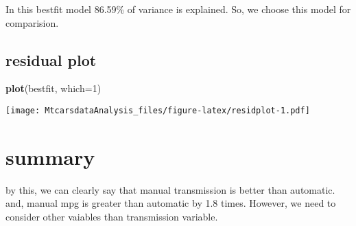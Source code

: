 \documentclass[
]{article}
\newenvironment{Shaded}{\begin{snugshade}}{\end{snugshade}}
\newcommand{\DataTypeTok}[1]{\textcolor[rgb]{0.13,0.29,0.53}{#1}}
\newcommand{\DecValTok}[1]{\textcolor[rgb]{0.00,0.00,0.81}{#1}}
\newcommand{\KeywordTok}[1]{\textcolor[rgb]{0.13,0.29,0.53}{\textbf{#1}}}
\newcommand{\NormalTok}[1]{#1}
\begin{document}
In this bestfit model 86.59\% of variance is explained. So, we choose
this model for comparision.

\hypertarget{residual-plot}{%
\subsection{residual plot}\label{residual-plot}}

\begin{Shaded}
\begin{Highlighting}[]
\KeywordTok{plot}\NormalTok{(bestfit, }\DataTypeTok{which=}\DecValTok{1}\NormalTok{)}
\end{Highlighting}
\end{Shaded}

\texttt{[image: MtcarsdataAnalysis\_files/figure-latex/residplot-1.pdf]}

\hypertarget{summary}{%
\section{summary}\label{summary}}

by this, we can clearly say that manual transmission is better than
automatic. and, manual mpg is greater than automatic by 1.8 times.
However, we need to consider other vaiables than transmission variable.
\end{document}
